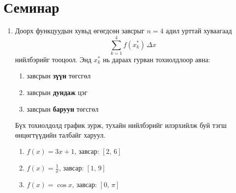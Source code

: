 \section{Семинар}
\begin{enumerate}
    \item Доорх функцуудын хувьд өгөгдсөн завсрыг 
$n=4$ адил урттай хуваагаад 
\[
\sum_{k=1}^4 f(x_k^*)\,\Delta x
\]
 нийлбэрийг тооцоол.
Энд $x_k^*$ нь дараах гурван тохиолдлоор авна:
\begin{enumerate}
\item[a)]  завсрын \textbf{зүүн} төгсгөл
\item[b)]  завсрын \textbf{дундаж} цэг
\item[c)]  завсрын \textbf{баруун} төгсгөл
\end{enumerate}

Бүх тохиолдолд график зурж, тухайн нийлбэрийг илэрхийлж буй тэгш өнцөгтүүдийн талбайг харуул.
\begin{enumerate}
\item $f(x)=3x+1$, \quad завсар: $[2,\,6]$

\item $f(x)=\frac{1}{x}$, \quad завсар: $[1,\,9]$

\item $f(x)=\cos x$, \quad завсар: $[0,\,\pi]$


\end{enumerate}
\end{enumerate}
